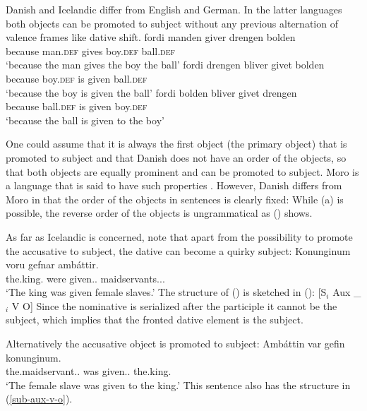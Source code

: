 Danish and Icelandic differ from English and German. In the latter languages both objects can be
promoted to subject without any previous alternation of valence frames like dative shift.
\eal
\ex\label{ex-fordi-manden-giver-drengen-bolden} 
\gll fordi manden giver drengen bolden\\ 
     because man.\textsc{def} gives boy.\textsc{def} ball.\textsc{def}\\\danish
\glt `because the man gives the boy the ball'
\ex\label{ex-boy-was-given-ball-danish}
\gll fordi drengen bliver givet bolden\\ 
     because boy.\textsc{def} is given ball.\textsc{def}\\
\glt `because the boy is given the ball'
\ex\label{ex-ball-was-given-boy-danish}
\gll fordi bolden bliver givet drengen\\ 
     because ball.\textsc{def} is given boy.\textsc{def}\\
\glt `because the ball is given to the boy'
\zl

One could assume that it is always the first object (the primary object) that is promoted to subject
and that Danish does not have an order of the objects, so that both objects are equally prominent
and can be promoted to subject. Moro is a language that is said to have such properties
\citep{AMM2013a}. However, Danish differs from Moro in that the order of the objects in sentences is
clearly fixed: While (a) is possible, the reverse order of the objects is ungrammatical as
() shows.
\z



As far as Icelandic is concerned, \citet*[]{ZMT85a} note that apart from the possibility to
promote the accusative to subject, the dative can become a quirky subject:
\ea
\label{ex-dat-subj-passive-ditransitive-icelandic}
\gll Konunginum voru gefnar ambáttir.\\
     the.king.\DAT{} were given.\F.\PL{} maidservants.\NOM.\F.\PL\\
\glt `The king was given female slaves.'
\z
The structure of () is sketched in ():
\ea
\label{sub-aux-v-o}
{}[S$_i$ Aux \_$_i$ V O] 
\z
Since the nominative is serialized after the participle it cannot be the subject, which implies that
the fronted dative element is the subject.

Alternatively the accusative object is promoted to subject:
\ea
\label{ex-nom-subj-passive-ditransitive-icelandic}
\gll Ambáttin var gefin konunginum.\\
     the.maidservant.\NOM.\SG{}  was given.\F.\SG{} the.king.\DAT\\
\glt `The female slave was given to the king.'
\z
This sentence also has the structure in (\ref{sub-aux-v-o}).

